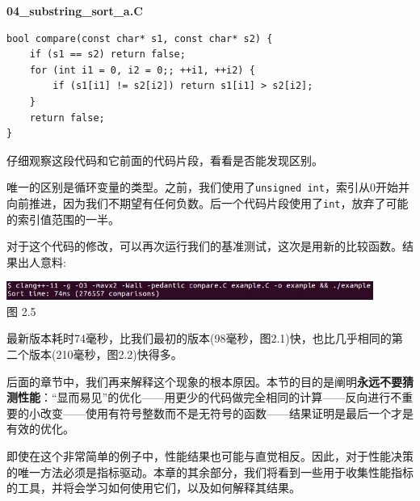 \noindent
\textbf{04\_substring\_sort\_a.C}
\begin{lstlisting}[style=styleCXX]
bool compare(const char* s1, const char* s2) {
	if (s1 == s2) return false;
	for (int i1 = 0, i2 = 0;; ++i1, ++i2) {
		if (s1[i1] != s2[i2]) return s1[i1] > s2[i2];
	}
	return false;
}
\end{lstlisting}

仔细观察这段代码和它前面的代码片段，看看是否能发现区别。

唯一的区别是循环变量的类型。之前，我们使用了\texttt{unsigned int}，索引从0开始并向前推进，因为我们不期望有任何负数。后一个代码片段使用了\texttt{int}，放弃了可能的索引值范围的一半。

对于这个代码的修改，可以再次运行我们的基准测试，这次是用新的比较函数。结果出人意料:

\begin{center}
\includegraphics[width=0.9\textwidth]{content/1/chapter2/images/5.jpg}\\
图 2.5
\end{center}

最新版本耗时74毫秒，比我们最初的版本(98毫秒，图2.1)快，也比几乎相同的第二个版本(210毫秒，图2.2)快得多。

后面的章节中，我们再来解释这个现象的根本原因。本节的目的是阐明\textbf{永远不要猜测性能}：“显而易见”的优化——用更少的代码做完全相同的计算——反向进行不重要的小改变——使用有符号整数而不是无符号的函数——结果证明是最后一个才是有效的优化。

即使在这个非常简单的例子中，性能结果也可能与直觉相反。因此，对于性能决策的唯一方法必须是指标驱动。本章的其余部分，我们将看到一些用于收集性能指标的工具，并将会学习如何使用它们，以及如何解释其结果。
